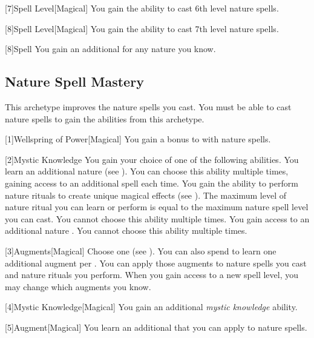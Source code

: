         [7]{Spell Level}[Magical] You gain the ability to cast 6th level nature spells.

        [8]{Spell Level}[Magical] You gain the ability to cast 7th level nature spells.

        [8]{Spell} You gain an additional  for any nature  you know.

    \subsection{Nature Spell Mastery}
        This archetype improves the nature spells you cast.
        You must be able to cast nature spells to gain the abilities from this archetype.

        [1]{Wellspring of Power}[Magical]
        You gain a  bonus to  with nature spells.

        [2]{Mystic Knowledge}
        You gain your choice of one of the following abilities.
        {
             You learn an additional nature  (see ).
                You can choose this ability multiple times, gaining access to an additional spell each time.
             You gain the ability to perform nature rituals to create unique magical effects (see ).
                The maximum level of nature ritual you can learn or perform is equal to the maximum nature spell level you can cast.
                You cannot choose this ability multiple times.
             You gain access to an additional nature .
                You cannot choose this ability multiple times.
        }

        [3]{Augments}[Magical]
        Choose one  (see ).
        You can also spend  to learn one additional augment per .
        You can apply those augments to nature spells you cast and nature rituals you perform.
        When you gain access to a new spell level, you may change which augments you know.

        [4]{Mystic Knowledge}[Magical]
        You gain an additional \textit{mystic knowledge} ability.

        [5]{Augment}[Magical]
        You learn an additional  that you can apply to nature spells.

